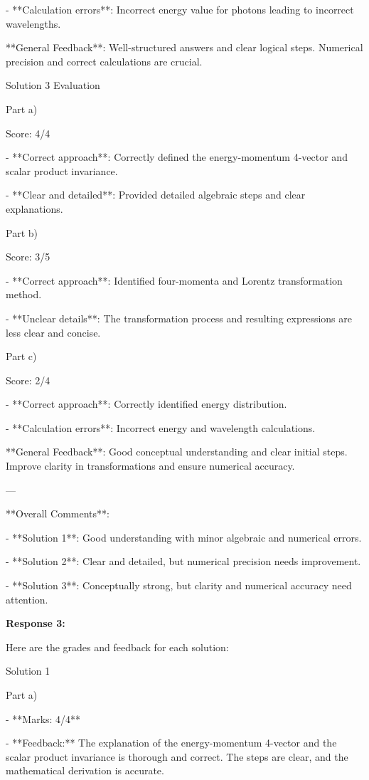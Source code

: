 \documentclass[a4paper,11pt]{article}
\begin{document}
- **Calculation errors**: Incorrect energy value for photons leading to incorrect wavelengths.

**General Feedback**: Well-structured answers and clear logical steps. Numerical precision and correct calculations are crucial.

Solution 3 Evaluation

Part a)

Score: 4/4

- **Correct approach**: Correctly defined the energy-momentum 4-vector and scalar product invariance.

- **Clear and detailed**: Provided detailed algebraic steps and clear explanations.

Part b)

Score: 3/5

- **Correct approach**: Identified four-momenta and Lorentz transformation method.

- **Unclear details**: The transformation process and resulting expressions are less clear and concise.

Part c)

Score: 2/4

- **Correct approach**: Correctly identified energy distribution.

- **Calculation errors**: Incorrect energy and wavelength calculations.

**General Feedback**: Good conceptual understanding and clear initial steps. Improve clarity in transformations and ensure numerical accuracy.

---

**Overall Comments**:

- **Solution 1**: Good understanding with minor algebraic and numerical errors.

- **Solution 2**: Clear and detailed, but numerical precision needs improvement.

- **Solution 3**: Conceptually strong, but clarity and numerical accuracy need attention.

\bigskip
\textbf{Response 3:}

Here are the grades and feedback for each solution:

Solution 1

Part a)

- **Marks: 4/4**

- **Feedback:** The explanation of the energy-momentum 4-vector and the scalar product invariance is thorough and correct. The steps are clear, and the mathematical derivation is accurate.
\end{document}
